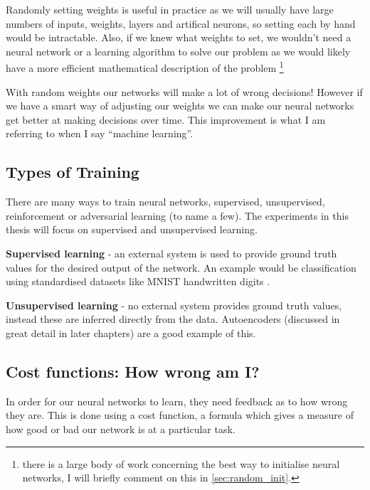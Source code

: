 Randomly setting weights is useful in practice as we will usually have large numbers of inputs, weights, layers and artifical neurons, so setting each by hand would be intractable. Also, if we knew what weights to set, we wouldn't need a neural network or a learning algorithm to solve our problem as we would likely have a more efficient mathematical description of the problem \footnote{there is a large body of work concerning the best way to initialise neural networks, I will briefly comment on this in \autoref{sec:random_init}.} 

With random weights our networks will make a lot of wrong decisions! However if we have a smart way of adjusting our weights we can make our neural networks get better at making decisions over time. This improvement is what I am referring to when I say ``machine learning''.

\subsection{Types of Training}
There are many ways to train neural networks, supervised, unsupervised, reinforcement or 
adversarial learning (to name a few). The experiments in this thesis will focus on supervised and unsupervised learning. %


\textbf{Supervised learning} - an external system is used to provide ground truth values for the desired output of the network. An example would be classification using standardised datasets like MNIST handwritten digits \cite{lecun1998mnist}.


\textbf{Unsupervised learning} - no external system provides ground truth values, instead these are inferred directly from the data. Autoencoders (discussed in great detail in later chapters) are a good example of this.  




\subsection{Cost functions: How wrong am I?}
In order for our neural networks to learn, they need feedback as to how wrong they are. This is done using a cost function, a formula which gives a measure of how good or bad our network is at a particular task.

